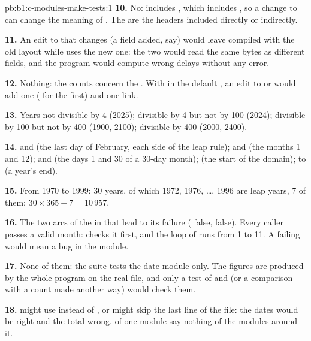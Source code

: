 \begin{solution}{pb:b1:c-modules-make-tests:1}
\textbf{10.} No:  includes , which includes , so a change to 
can change the meaning of . The  are the headers included directly or indirectly.

\textbf{11.} An edit to  that changes  (a field added, say) would leave 
compiled with the old layout while  uses the new one: the two would read the same bytes as different
fields, and the program would compute wrong delays without any error.

\textbf{12.} Nothing: the counts concern the  . With  in the default , an edit
to  or  would add one  ( for the first) and one link.

\textbf{13.} Years not divisible by 4 (2025); divisible by 4 but not by 100 (2024); divisible by 100 but not by 400
(1900, 2100); divisible by 400 (2000, 2400).

\textbf{14.}  and  (the last day of February, each side of the leap rule);
 and  (the months 1 and 12);  and  (the days 1 and 30
of a 30-day month);  (the start of the domain);  to  (a year's end).

\textbf{15.} From 1970 to 1999: 30 years, of which 1972, 1976, \dots, 1996 are leap years, 7 of them;
$30 \times 365 + 7 = 10\,957$.

\textbf{16.} The two arcs of the  in  that lead to its failure ( false,
 false). Every caller passes a valid month:  checks it first, and the loop of
 runs from 1 to 11. A failing  would mean a bug in the module.

\textbf{17.} None of them: the suite tests the date module only. The figures are produced by the whole program on the
real file, and only a test of  and  (or a comparison with a count made another way) would
check them.

\textbf{18.}  might use  instead of , or  might skip the
last line of the file: the dates would be right and the total wrong.  of one module say nothing of the
modules around it.


\end{solution}
